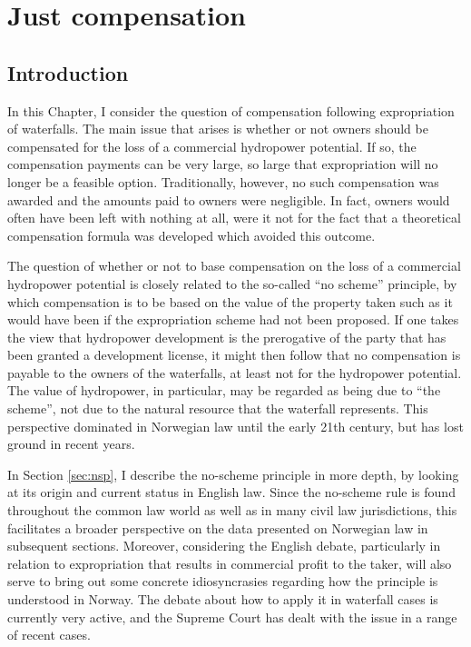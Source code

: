 \chapter{Just compensation}\label{chap:5}

\section{Introduction}\label{sec:into5}

In this Chapter, I consider the question of compensation following expropriation of waterfalls. The main issue that arises is whether or not owners should be compensated for the loss of a commercial hydropower potential. If so, the compensation payments can be very large, so large that expropriation will no longer be a feasible option. Traditionally, however, no such compensation was awarded and the amounts paid to owners were negligible. In fact, owners would often have been left with nothing at all, were it not for the fact that a theoretical compensation formula was developed which avoided this outcome.

The question of whether or not to base compensation on the loss of a commercial hydropower potential is closely related to the so-called ``no scheme'' principle, by which compensation is to be based on the value of the property taken such as it would have been if the expropriation scheme had not been proposed. If one takes the view that hydropower development is the prerogative of the party that has been granted a development license, it might then follow that no compensation is payable to the owners of the waterfalls, at least not for the hydropower potential. The value of hydropower, in particular, may be regarded as being due to ``the scheme'', not due to the natural resource that the waterfall represents. This perspective dominated in Norwegian law until the early 21th century, but has lost ground in recent years.

In Section \ref{sec:nsp}, I describe the no-scheme principle in more depth, by looking at its origin and current status in English law. Since the no-scheme rule is found throughout the common law world as well as in many civil law jurisdictions, this facilitates a broader perspective on the data presented on Norwegian law in subsequent sections.  Moreover, considering the English debate, particularly in relation to expropriation that results in commercial profit to the taker, will also serve to bring out some concrete idiosyncrasies regarding how the principle is understood in Norway. The debate about how to apply it in waterfall cases is currently very active, and the Supreme Court has dealt with the issue in a range of recent cases. 


